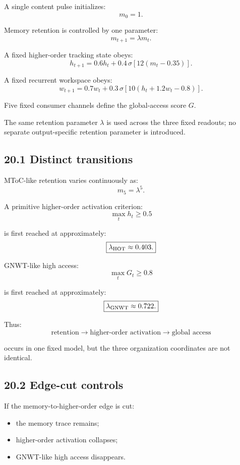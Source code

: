 \documentclass[
  11pt,
  a4paper,
]{article}
\providecommand{\tightlist}{%
  \setlength{\itemsep}{0pt}\setlength{\parskip}{0pt}}
\begin{document}
A single content pulse initializes:
\nopagebreak[4]
\[
m_0=1.
\]

Memory retention is controlled by one parameter:
\nopagebreak[4]
\[
m_{t+1}=\lambda m_t.
\]

A fixed higher-order tracking state obeys:
\nopagebreak[4]
\[
h_{t+1}
=
0.6h_t
+
0.4\,\sigma[12(m_t-0.35)].
\]

A fixed recurrent workspace obeys:
\nopagebreak[4]
\[
w_{t+1}
=
0.7w_t
+
0.3\,\sigma[10(h_t+1.2w_t-0.8)].
\]

Five fixed consumer channels define the global-access score \(G\).

The same retention parameter \(\lambda\) is used across the three fixed
readouts; no separate output-specific retention parameter is introduced.

\hypertarget{distinct-transitions}{%
\subsection{20.1 Distinct transitions}\label{distinct-transitions}}

MToC-like retention varies continuously as:
\nopagebreak[4]
\[
m_5=\lambda^5.
\]

A primitive higher-order activation criterion:
\nopagebreak[4]
\[
\max_t h_t\ge0.5
\]

is first reached at approximately:
\nopagebreak[4]
\[
\boxed{
\lambda_{\rm HOT}\approx0.403.
}
\]

GNWT-like high access:
\nopagebreak[4]
\[
\max_t G_t\ge0.8
\]

is first reached at approximately:
\nopagebreak[4]
\[
\boxed{
\lambda_{\rm GNWT}\approx0.722.
}
\]

Thus:
\nopagebreak[4]
\[
\boxed{
\text{retention}
\rightarrow
\text{higher-order activation}
\rightarrow
\text{global access}
}
\]

occurs in one fixed model, but the three organization coordinates are
not identical.

\hypertarget{edge-cut-controls}{%
\subsection{20.2 Edge-cut controls}\label{edge-cut-controls}}

If the memory-to-higher-order edge is cut:

\begin{itemize}
\tightlist
\item
  the memory trace remains;
\item
  higher-order activation collapses;
\item
  GNWT-like high access disappears.
\end{itemize}
\end{document}

